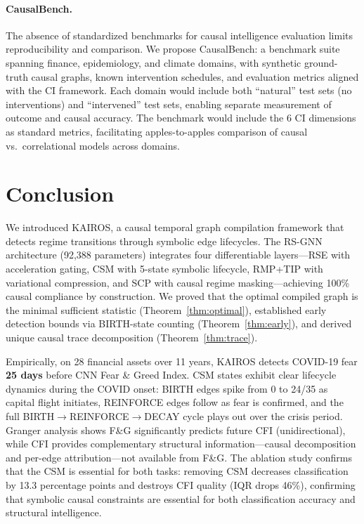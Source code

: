 \documentclass[11pt]{article}
\begin{document}
\paragraph{CausalBench.} The absence of standardized benchmarks for causal intelligence evaluation limits reproducibility and comparison. We propose CausalBench: a benchmark suite spanning finance, epidemiology, and climate domains, with synthetic ground-truth causal graphs, known intervention schedules, and evaluation metrics aligned with the CI framework. Each domain would include both ``natural'' test sets (no interventions) and ``intervened'' test sets, enabling separate measurement of outcome and causal accuracy. The benchmark would include the 6 CI dimensions as standard metrics, facilitating apples-to-apples comparison of causal vs.\ correlational models across domains.

\section{Conclusion}

We introduced KAIROS, a causal temporal graph compilation framework that detects regime transitions through symbolic edge lifecycles. The RS-GNN architecture (92,388 parameters) integrates four differentiable layers---RSE with acceleration gating, CSM with 5-state symbolic lifecycle, RMP+TIP with variational compression, and SCP with causal regime masking---achieving 100\% causal compliance by construction. We proved that the optimal compiled graph is the minimal sufficient statistic (Theorem~\ref{thm:optimal}), established early detection bounds via BIRTH-state counting (Theorem~\ref{thm:early}), and derived unique causal trace decomposition (Theorem~\ref{thm:trace}).

Empirically, on 28 financial assets over 11 years, KAIROS detects COVID-19 fear \textbf{25 days} before CNN Fear \& Greed Index. CSM states exhibit clear lifecycle dynamics during the COVID onset: BIRTH edges spike from 0 to 24/35 as capital flight initiates, REINFORCE edges follow as fear is confirmed, and the full BIRTH$\to$REINFORCE$\to$DECAY cycle plays out over the crisis period. Granger analysis shows F\&G significantly predicts future CFI (unidirectional), while CFI provides complementary structural information---causal decomposition and per-edge attribution---not available from F\&G. The ablation study confirms that the CSM is essential for both tasks: removing CSM decreases classification by 13.3 percentage points and destroys CFI quality (IQR drops 46\%), confirming that symbolic causal constraints are essential for both classification accuracy and structural intelligence.
\end{document}
